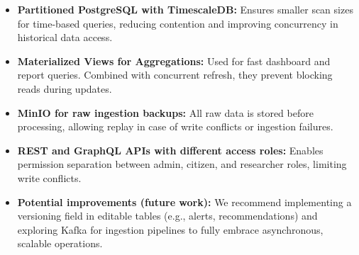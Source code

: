 \begin{itemize}
    \item \textbf{Partitioned PostgreSQL with TimescaleDB:} Ensures smaller scan sizes for time-based queries, reducing contention and improving concurrency in historical data access.
    
    \item \textbf{Materialized Views for Aggregations:} Used for fast dashboard and report queries. Combined with concurrent refresh, they prevent blocking reads during updates.
    
    \item \textbf{MinIO for raw ingestion backups:} All raw data is stored before processing, allowing replay in case of write conflicts or ingestion failures.
    
    \item \textbf{REST and GraphQL APIs with different access roles:} Enables permission separation between admin, citizen, and researcher roles, limiting write conflicts.
    
    \item \textbf{Potential improvements (future work):} We recommend implementing a versioning field in editable tables (e.g., alerts, recommendations) and exploring Kafka for ingestion pipelines to fully embrace asynchronous, scalable operations.
\end{itemize}
